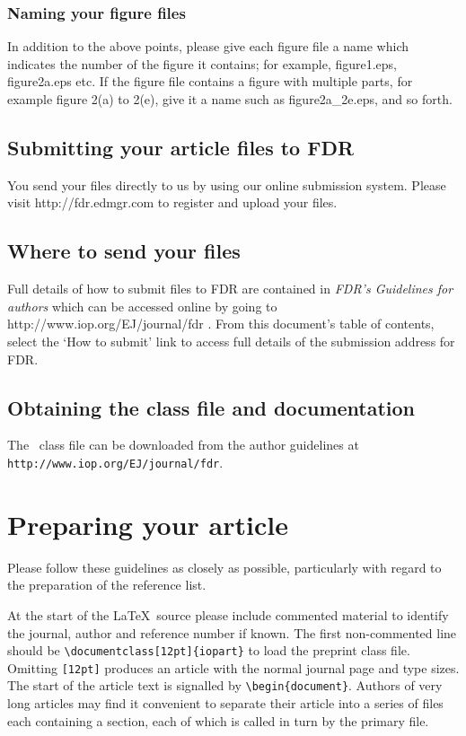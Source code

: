\documentclass[12pt]{iopart}
\begin{document}
\subsubsection{\label{fname}Naming your figure files} In addition to the above points, please give each figure file a name which indicates the number of the figure it contains; for example, figure1.eps, figure2a.eps etc. If the figure file contains a figure with multiple parts, for example figure 2(a) to 2(e), give it a name such as figure2a\_2e.eps, and so forth.

\subsection{Submitting your article files to FDR}
You send your files directly to us by using our online submission system. Please visit http://fdr.edmgr.com to register and upload your files.

\subsection{Where to send your files \label{agide}}
Full details of how to submit files to FDR are contained in {\it FDR's Guidelines for authors} which can be accessed online by going to http://www.iop.org/EJ/journal/fdr . From this document's table of contents, select the `How to submit' link to access full details of the submission address for FDR.

\subsection{Obtaining the class file and documentation}
The  \LaTeXe\ class file can be downloaded from the author guidelines at \verb"http://www.iop.org/EJ/journal/fdr". 

\section{Preparing your article}

Please follow these guidelines as closely as possible, particularly with regard to the preparation of the reference list.

At the start of the \LaTeX\ source please include 
commented material to identify the journal, author and reference number if 
known. The first non-commented line should be 
\verb"\documentclass[12pt]{iopart}"  to load the preprint class 
file. Omitting \verb"[12pt]" produces an article with the normal journal
page and type sizes. The start of the article text is signalled by 
\verb"\begin{document}".
Authors of very long articles may find it convenient to separate 
their article into a series of files each containing a section, each of which is called 
in turn by the primary file. 
\end{document}
